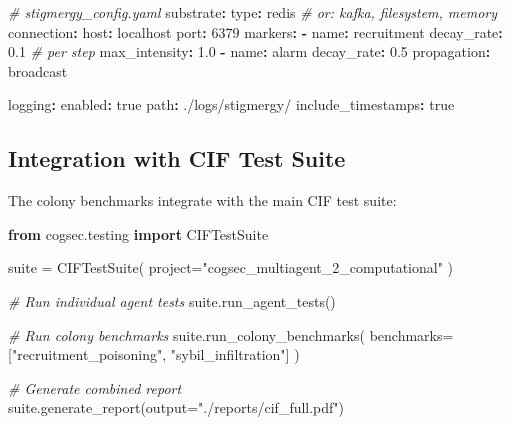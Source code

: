 \documentclass[
]{article}
\newenvironment{Shaded}{}{}
\newcommand{\AttributeTok}[1]{\textcolor[rgb]{0.49,0.56,0.16}{#1}}
\newcommand{\CharTok}[1]{\textcolor[rgb]{0.25,0.44,0.63}{#1}}
\newcommand{\CommentTok}[1]{\textcolor[rgb]{0.38,0.63,0.69}{\textit{#1}}}
\newcommand{\DecValTok}[1]{\textcolor[rgb]{0.25,0.63,0.44}{#1}}
\newcommand{\FloatTok}[1]{\textcolor[rgb]{0.25,0.63,0.44}{#1}}
\newcommand{\FunctionTok}[1]{\textcolor[rgb]{0.02,0.16,0.49}{#1}}
\newcommand{\ImportTok}[1]{\textcolor[rgb]{0.00,0.50,0.00}{\textbf{#1}}}
\newcommand{\KeywordTok}[1]{\textcolor[rgb]{0.00,0.44,0.13}{\textbf{#1}}}
\newcommand{\NormalTok}[1]{#1}
\newcommand{\OperatorTok}[1]{\textcolor[rgb]{0.40,0.40,0.40}{#1}}
\newcommand{\StringTok}[1]{\textcolor[rgb]{0.25,0.44,0.63}{#1}}
\begin{document}
\begin{Shaded}
\begin{Highlighting}[]
\CommentTok{\# stigmergy\_config.yaml}
\FunctionTok{substrate}\KeywordTok{:}
\AttributeTok{  }\FunctionTok{type}\KeywordTok{:}\AttributeTok{ redis}\CommentTok{  \# or: kafka, filesystem, memory}
\AttributeTok{  }\FunctionTok{connection}\KeywordTok{:}
\AttributeTok{    }\FunctionTok{host}\KeywordTok{:}\AttributeTok{ localhost}
\AttributeTok{    }\FunctionTok{port}\KeywordTok{:}\AttributeTok{ }\DecValTok{6379}
\AttributeTok{  }
\AttributeTok{  }\FunctionTok{markers}\KeywordTok{:}
\AttributeTok{    }\KeywordTok{{-}}\AttributeTok{ }\FunctionTok{name}\KeywordTok{:}\AttributeTok{ recruitment}
\AttributeTok{      }\FunctionTok{decay\_rate}\KeywordTok{:}\AttributeTok{ }\FloatTok{0.1}\CommentTok{  \# per step}
\AttributeTok{      }\FunctionTok{max\_intensity}\KeywordTok{:}\AttributeTok{ }\FloatTok{1.0}
\AttributeTok{    }\KeywordTok{{-}}\AttributeTok{ }\FunctionTok{name}\KeywordTok{:}\AttributeTok{ alarm}
\AttributeTok{      }\FunctionTok{decay\_rate}\KeywordTok{:}\AttributeTok{ }\FloatTok{0.5}
\AttributeTok{      }\FunctionTok{propagation}\KeywordTok{:}\AttributeTok{ broadcast}

\AttributeTok{  }\FunctionTok{logging}\KeywordTok{:}
\AttributeTok{    }\FunctionTok{enabled}\KeywordTok{:}\AttributeTok{ }\CharTok{true}
\AttributeTok{    }\FunctionTok{path}\KeywordTok{:}\AttributeTok{ ./logs/stigmergy/}
\AttributeTok{    }\FunctionTok{include\_timestamps}\KeywordTok{:}\AttributeTok{ }\CharTok{true}
\end{Highlighting}
\end{Shaded}

\subsection{Integration with CIF Test
Suite}\label{integration-with-cif-test-suite}

The colony benchmarks integrate with the main CIF test suite:

\begin{Shaded}
\begin{Highlighting}[]
\ImportTok{from}\NormalTok{ cogsec.testing }\ImportTok{import}\NormalTok{ CIFTestSuite}

\NormalTok{suite }\OperatorTok{=}\NormalTok{ CIFTestSuite(}
\NormalTok{    project}\OperatorTok{=}\StringTok{"cogsec\_multiagent\_2\_computational"}
\NormalTok{)}

\CommentTok{\# Run individual agent tests}
\NormalTok{suite.run\_agent\_tests()}

\CommentTok{\# Run colony benchmarks}
\NormalTok{suite.run\_colony\_benchmarks(}
\NormalTok{    benchmarks}\OperatorTok{=}\NormalTok{[}\StringTok{"recruitment\_poisoning"}\NormalTok{, }\StringTok{"sybil\_infiltration"}\NormalTok{]}
\NormalTok{)}

\CommentTok{\# Generate combined report}
\NormalTok{suite.generate\_report(output}\OperatorTok{=}\StringTok{"./reports/cif\_full.pdf"}\NormalTok{)}
\end{Highlighting}
\end{Shaded}
\end{document}
